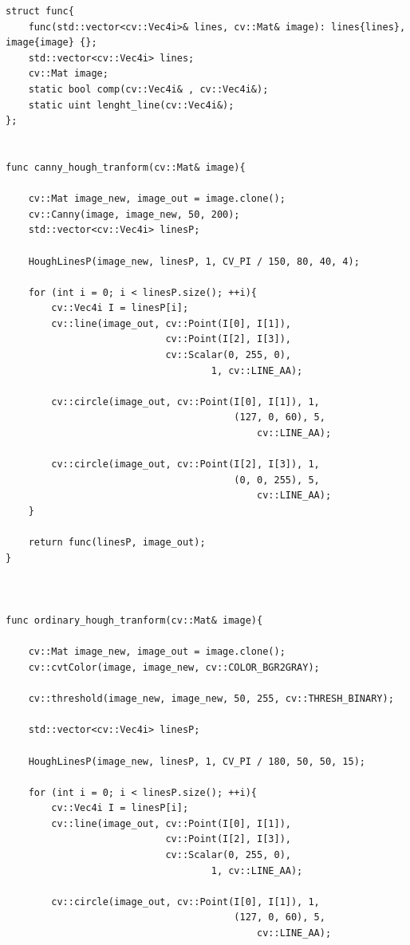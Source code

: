 \begin{lstlisting}[style=cpp_white, caption={Вспомогательные функции и структура}]
struct func{
    func(std::vector<cv::Vec4i>& lines, cv::Mat& image): lines{lines}, image{image} {};
    std::vector<cv::Vec4i> lines;
    cv::Mat image;
    static bool comp(cv::Vec4i& , cv::Vec4i&);
    static uint lenght_line(cv::Vec4i&);
};


func canny_hough_tranform(cv::Mat& image){

    cv::Mat image_new, image_out = image.clone();
    cv::Canny(image, image_new, 50, 200);
    std::vector<cv::Vec4i> linesP;

    HoughLinesP(image_new, linesP, 1, CV_PI / 150, 80, 40, 4);

    for (int i = 0; i < linesP.size(); ++i){
        cv::Vec4i I = linesP[i];
        cv::line(image_out, cv::Point(I[0], I[1]),
                            cv::Point(I[2], I[3]),
                            cv::Scalar(0, 255, 0), 
                                    1, cv::LINE_AA);

        cv::circle(image_out, cv::Point(I[0], I[1]), 1,
                                        (127, 0, 60), 5, 
                                            cv::LINE_AA);

        cv::circle(image_out, cv::Point(I[2], I[3]), 1, 
                                        (0, 0, 255), 5, 
                                            cv::LINE_AA);
    }

    return func(linesP, image_out);
}



func ordinary_hough_tranform(cv::Mat& image){

    cv::Mat image_new, image_out = image.clone();
    cv::cvtColor(image, image_new, cv::COLOR_BGR2GRAY);

    cv::threshold(image_new, image_new, 50, 255, cv::THRESH_BINARY);

    std::vector<cv::Vec4i> linesP;

    HoughLinesP(image_new, linesP, 1, CV_PI / 180, 50, 50, 15);

    for (int i = 0; i < linesP.size(); ++i){
        cv::Vec4i I = linesP[i];
        cv::line(image_out, cv::Point(I[0], I[1]),
                            cv::Point(I[2], I[3]),
                            cv::Scalar(0, 255, 0), 
                                    1, cv::LINE_AA);

        cv::circle(image_out, cv::Point(I[0], I[1]), 1,
                                        (127, 0, 60), 5, 
                                            cv::LINE_AA);


\end{lstlisting}
